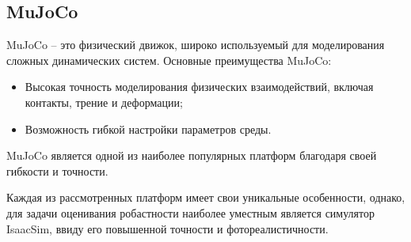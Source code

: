    \subsection{MuJoCo}
    MuJoCo \cite{todorov2012mujoco} -- это физический движок, широко используемый для моделирования сложных динамических систем. Основные преимущества MuJoCo:
    \begin{itemize}
        \item Высокая точность моделирования физических взаимодействий, включая контакты, трение и деформации;
        \item Возможность гибкой настройки параметров среды.
    \end{itemize}
    MuJoCo является одной из наиболее популярных платформ благодаря своей гибкости и точности.

    Каждая из рассмотренных платформ имеет свои уникальные особенности, однако, для задачи оценивания робастности наиболее уместным является симулятор IsaacSim, ввиду его повышенной точности и фотореалистичности. 
      